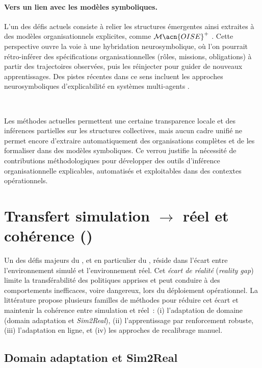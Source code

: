 \paragraph{Vers un lien avec les modèles symboliques.}
L’un des défis actuels consiste à relier les structures émergentes
ainsi extraites à des modèles organisationnels explicites,
comme $\mathcal{M}\acn{OISE}^+$ \cite{hubner2007using}.
Cette perspective ouvre la voie à une hybridation neurosymbolique,
où l’on pourrait rétro-inférer des spécifications organisationnelles
(rôles, missions, obligations) à partir des trajectoires observées,
puis les réinjecter pour guider de nouveaux apprentissages.
Des pistes récentes dans ce sens incluent les approches neurosymboliques
d’explicabilité en systèmes multi-agents \cite{subramanian2024neurosymbolic}.

\

Les méthodes actuelles permettent une certaine transparence locale
et des inférences partielles sur les structures collectives,
mais aucun cadre unifié ne permet encore
d’extraire automatiquement des organisations complètes
et de les formaliser dans des modèles symboliques.
Ce verrou justifie la nécessité de contributions méthodologiques
pour développer des outils d’inférence organisationnelle
explicables, automatisés et exploitables dans des contextes opérationnels.

\section{Transfert simulation $\rightarrow$ réel et cohérence ()}

\noindent
Un des défis majeurs du , et en particulier du , réside dans l’écart
entre l’environnement simulé et l’environnement réel. Cet \textit{écart de réalité}
(\textit{reality gap}) limite la transférabilité des politiques apprises et
peut conduire à des comportements inefficaces, voire dangereux,
lors du déploiement opérationnel. La littérature propose plusieurs familles de méthodes
pour réduire cet écart et maintenir la cohérence entre simulation et réel~:
(i) l’adaptation de domaine (domain adaptation et \textit{Sim2Real}),
(ii) l’apprentissage par renforcement robuste,
(iii) l’adaptation en ligne, et
(iv) les approches de recalibrage manuel.

\subsection{Domain adaptation et Sim2Real}

